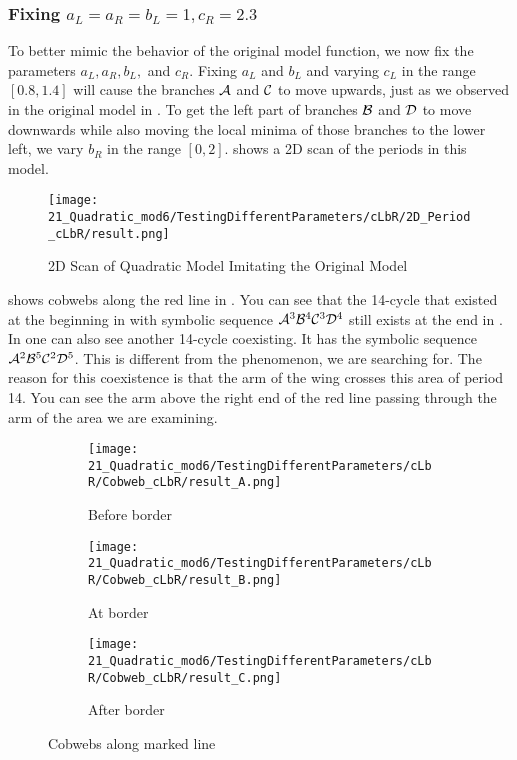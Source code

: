 \subsubsection{Fixing $a_L = a_R = b_L = 1, c_R = 2.3$}

To better mimic the behavior of the original model function, we now fix the parameters $a_L, a_R, b_L,$ and $c_R$.
Fixing $a_L$ and $b_L$ and varying $c_L$ in the range $[0.8, 1.4]$ will cause the branches $\mathcal{A}$ and $\mathcal{C}$ to move upwards, just as we observed in the original model in .
To get the left part of branches $\mathcal{B}$ and $\mathcal{D}$ to move downwards while also moving the local minima of those branches to the lower left, we vary $b_R$ in the range $[0, 2]$.
 shows a 2D scan of the periods in this model.


\begin{figure}
	\centering
	\texttt{[image: 21\_Quadratic\_mod6/TestingDifferentParameters/cLbR/2D\_Period\_cLbR/result.png]}
	\caption{2D Scan of Quadratic Model Imitating the Original Model}
	\label{fig:quadratic.full.cLbR.2d.full}
\end{figure}

 shows cobwebs along the red line in .
You can see that the 14-cycle that existed at the beginning in  with symbolic sequence $\mathcal{A}^3\mathcal{B}^4\mathcal{C}^3\mathcal{D}^4$ still exists at the end in .
In  one can also see another 14-cycle coexisting.
It has the symbolic sequence $\mathcal{A}^2\mathcal{B}^5\mathcal{C}^2\mathcal{D}^5$.
This is different from the phenomenon, we are searching for.
The reason for this coexistence is that the arm of the wing crosses this area of period 14.
You can see the arm above the right end of the red line passing through the arm of the area we are examining.

\begin{figure}
	\centering
	\begin{subfigure}{0.3\textwidth}
		\centering
		\texttt{[image: 21\_Quadratic\_mod6/TestingDifferentParameters/cLbR/Cobweb\_cLbR/result\_A.png]}
		\caption{Before border}
		\label{fig:quad.full.cLbR.CobwebA}
	\end{subfigure}
	\begin{subfigure}{0.3\textwidth}
		\centering
		\texttt{[image: 21\_Quadratic\_mod6/TestingDifferentParameters/cLbR/Cobweb\_cLbR/result\_B.png]}
		\caption{At border}
		\label{fig:quad.full.cLbR.CobwebB}
	\end{subfigure}
	\begin{subfigure}{0.3\textwidth}
		\centering
		\texttt{[image: 21\_Quadratic\_mod6/TestingDifferentParameters/cLbR/Cobweb\_cLbR/result\_C.png]}
		\caption{After border}
		\label{fig:quad.full.cLbR.CobwebC}
	\end{subfigure}
	\caption{Cobwebs along marked line}
	\label{fig:quad.full.cLbR.Cobwebs}
\end{figure}

